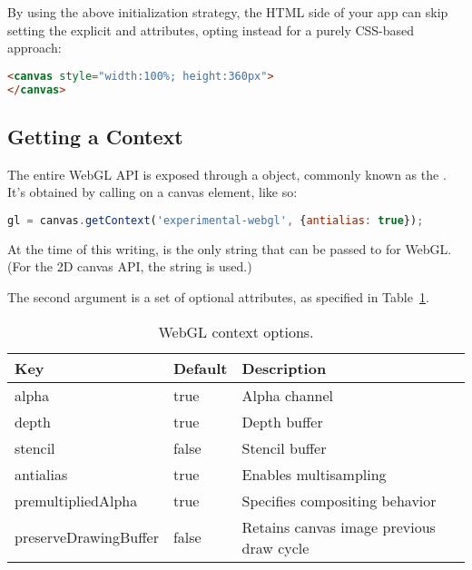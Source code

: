 By using the above initialization strategy, the HTML side of your app can skip setting the explicit  and  attributes, opting instead for a purely CSS-based approach:

\begin{lstlisting}[language=HTML]
<canvas style="width:100%; height:360px">
</canvas>
\end{lstlisting}

\subsection{Getting a Context}
\label{sec:context}

The entire WebGL API is exposed through a   object, commonly known as the  .  It's obtained by calling   on a canvas element, like so:

\begin{lstlisting}[language=JavaScript]
  gl = canvas.getContext('experimental-webgl', {antialias: true});
\end{lstlisting}

At the time of this writing,   is the only string that can be passed to  for WebGL.  (For the 2D canvas API, the string  is used.)

The second argument is a set of optional attributes, as specified in Table~\ref{tab:ContextAttributes}.

\begin{table}[htb]\centering
  \begin{tabular}{lll}
    \hline
    Key & Default & Description \\
    \hline
    alpha & true & Alpha channel \\
    depth & true & Depth buffer \\
    stencil & false & Stencil buffer \\
    antialias & true & Enables multisampling \\
    premultipliedAlpha & true & Specifies compositing behavior \\
    preserveDrawingBuffer & false & Retains canvas image previous draw cycle \\
    \hline
  \end{tabular}
  \caption{WebGL context options.}
  \label{tab:ContextAttributes}
\end{table}

